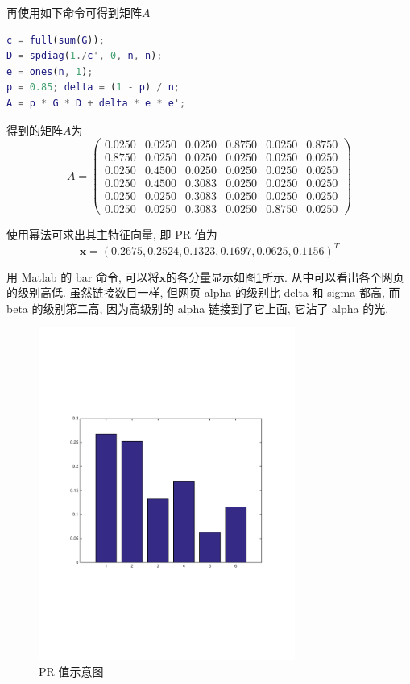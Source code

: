 \documentclass[a4paper,UTF8]{ctexart}
\theoremstyle{plain} \newtheorem{theorem}{定理}[section]
\theoremstyle{plain} \newtheorem{definition}{定义}[section]
\theoremstyle{plain} \newtheorem{lemma}{引理}[section]
\theoremstyle{plain} \newtheorem{proposition}{命题}[section]
\theoremstyle{plain} \newtheorem{example}{例}[section]
\theoremstyle{plain} \newtheorem{remark}{注}[section]
\theoremstyle{plain} \newtheorem{corollary}{推论}[section]
\begin{document}
再使用如下命令可得到矩阵$A$
\begin{lstlisting}[language = matlab]
c = full(sum(G));
D = spdiag(1./c', 0, n, n);
e = ones(n, 1);
p = 0.85; delta = (1 - p) / n;
A = p * G * D + delta * e * e';
\end{lstlisting}

得到的矩阵$A$为
$$
A = 
\begin{pmatrix}
0.0250 & 0.0250 & 0.0250 & 0.8750 & 0.0250 & 0.8750 \\ 
0.8750 & 0.0250 & 0.0250 & 0.0250 & 0.0250 & 0.0250 \\ 
0.0250 & 0.4500 & 0.0250 & 0.0250 & 0.0250 & 0.0250 \\ 
0.0250 & 0.4500 & 0.3083 & 0.0250 & 0.0250 & 0.0250 \\ 
0.0250 & 0.0250 & 0.3083 & 0.0250 & 0.0250 & 0.0250 \\ 
0.0250 & 0.0250 & 0.3083 & 0.0250 & 0.8750 & 0.0250
\end{pmatrix}
$$

使用幂法可求出其主特征向量, 即 PR 值为
\begin{equation*}
\bm{x} = (0.2675, 0.2524, 0.1323, 0.1697, 0.0625, 0.1156)^{T}
\end{equation*}

用 Matlab 的 bar 命令, 可以将$\bm{x}$的各分量显示如图\ref{bar}所示. 从中可以看出各个网页的级别高低. 虽然链接数目一样, 但网页 alpha 的级别比 delta 和 sigma 都高, 而 beta 的级别第二高, 因为高级别的 alpha 链接到了它上面, 它沾了 alpha 的光.
\begin{figure}[!htb]
  \centering
  \includegraphics[width=0.75\textwidth]{bar.pdf}
  \caption{PR 值示意图}
  \label{bar}
\end{figure}
\end{document}
